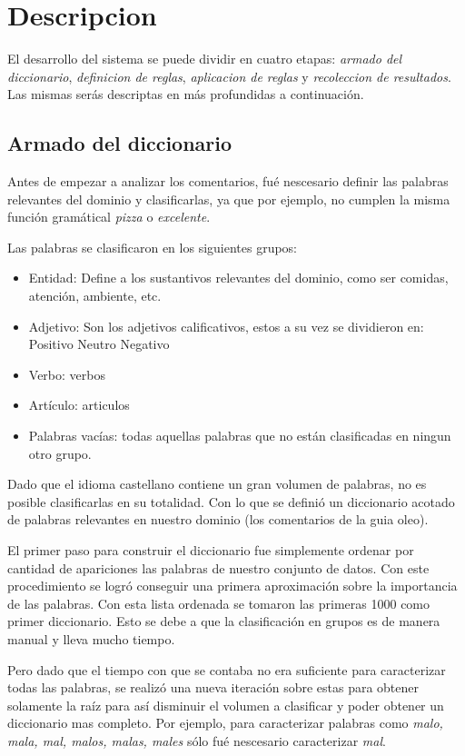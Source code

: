 \section{Descripcion}

El desarrollo del sistema se puede dividir en cuatro etapas: \emph{armado del diccionario}, \emph{definicion de reglas}, \emph{aplicacion de reglas} y \emph{recoleccion de resultados}. Las mismas serás descriptas en más profundidas a continuación.

\subsection{Armado del diccionario}

Antes de empezar a analizar los comentarios, fué nescesario definir las palabras relevantes del dominio y clasificarlas, ya que por ejemplo, no cumplen la misma función gramátical \emph{pizza} o \emph{excelente}.

Las palabras se clasificaron en los siguientes grupos: 
\begin{itemize}
\item Entidad: Define a los sustantivos relevantes del dominio, como ser comidas, atención, ambiente, etc.
\item Adjetivo: Son los adjetivos calificativos, estos a su vez se dividieron en:
\subitem Positivo
\subitem Neutro
\subitem Negativo
\item Verbo: verbos
\item Artículo: articulos
\item Palabras vacías: todas aquellas palabras que no están clasificadas en ningun otro grupo.
\end{itemize}

Dado que el idioma castellano contiene un gran volumen de palabras, no es posible clasificarlas en su totalidad. Con lo que se definió un diccionario acotado de palabras relevantes en nuestro dominio (los comentarios de la guia oleo).

El primer paso para construir el diccionario fue simplemente ordenar por cantidad de apariciones las palabras de nuestro conjunto de datos. Con este procedimiento se logró conseguir una primera aproximación sobre la importancia de las palabras. Con esta lista ordenada se tomaron las primeras 1000 como primer diccionario. Esto se debe a que la clasificación en grupos es de manera manual y lleva mucho tiempo.

Pero dado que el tiempo con que se contaba no era suficiente para caracterizar todas las palabras, se realizó una nueva iteración sobre estas para obtener solamente la raíz para así disminuir el volumen a clasificar y poder obtener un diccionario mas completo. Por ejemplo, para caracterizar palabras como \emph{malo, mala, mal, malos, malas, males} sólo fué nescesario caracterizar \emph{mal}.

